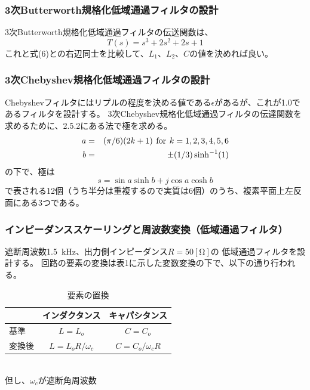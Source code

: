 \documentclass[10pt,a4j,dvipdfmx]{jsarticle}
\begin{document}
\subsubsection{3次Butterworth規格化低域通過フィルタの設計}
3次Butterworth規格化低域通過フィルタの伝送関数は、
\begin{equation}
T(s)  = s^3 + 2s^2 + 2s + 1
\end{equation}
これと式(6)との右辺同士を比較して、$L_1$、$L_2$、$C$の値を決めれば良い。

\subsubsection{3次Chebyshev規格化低域通過フィルタの設計}
Chebyshevフィルタにはリプルの程度を決める値である$\epsilon$があるが、これが1.0であるフィルタを設計する。
3次Chebyshev規格化低域通過フィルタの伝達関数を求めるために、2.5.2にある法で極を求める。
\begin{eqnarray}
a &=& (\pi/6)(2k+1) \hspace{4pt} {\rm for}\hspace{4pt} k = 1, 2, 3, 4, 5, 6  \\
b &=& \pm (1/3)\sinh^{-1}(1)\\
\end{eqnarray}
の下で、極は
\begin{equation}
s = \sin a \sinh b + j \cos a \cosh b
\end{equation}
で表される12個（うち半分は重複するので実質は6個）のうち、複素平面上左反面にある3つである。

\subsubsection{インピーダンススケーリングと周波数変換（低域通過フィルタ）}
遮断周波数\SI{1.5}{\kilo\hertz}、出力側インピーダンス$R = 50[\si{\ohm}]$の
低域通過フィルタを設計する。
回路の要素の変換は表1に示した変数変換の下で、以下の通り行われる。

\begin{table}[htb]
  \begin{center}
    \caption{要素の置換}
    \begin{tabular}{|l||c|c|} \hline
       & インダクタンス & キャパシタンス\\ \hline \hline
      基準 & $L=L_o$ & $C=C_o$ \\
      変換後 & $L=L_oR/\omega_c$ & $C=C_o/\omega_cR$ \\ \hline
    \end{tabular}
    \\ 但し、$\omega_c$が遮断角周波数
  \end{center}
\end{table}
\end{document}

